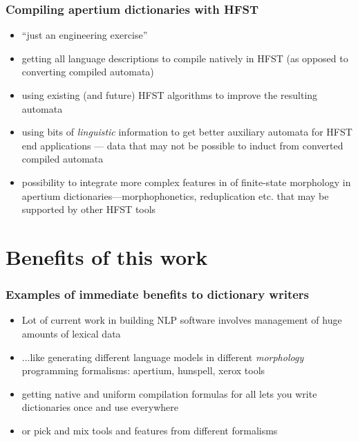\documentclass{beamer}
\begin{document}
\begin{frame}
    \frametitle{Compiling apertium dictionaries with HFST}
    \begin{itemize}
        \item ``just an engineering exercise''
        \item getting all language descriptions to compile natively in HFST (as
            opposed to converting compiled automata)
        \item using existing (and future) HFST algorithms to improve the
            resulting automata
        \item using bits of \emph{linguistic} information to get better
            auxiliary automata for HFST end applications --- data that may not
            be possible to induct from converted compiled automata
        \item possibility to integrate more complex features in of finite-state
            morphology in apertium dictionaries---morphophonetics, reduplication
            etc. that may be supported by other HFST tools
    \end{itemize}
\end{frame}

\section{Benefits of this work}

\begin{frame}
    \frametitle{Examples of immediate benefits to dictionary writers}
    \begin{itemize}
        \item Lot of current work in building NLP software involves management
            of huge amounts of lexical data
        \item ...like generating different language models in different
            \emph{morphology} programming formalisms: apertium, hunspell,
            xerox tools
        \item getting native and uniform compilation formulas for all lets
            you \alert{write dictionaries once} and use everywhere
        \item or pick and mix tools and features from different formalisms
    \end{itemize}
\end{frame}
\end{document}
